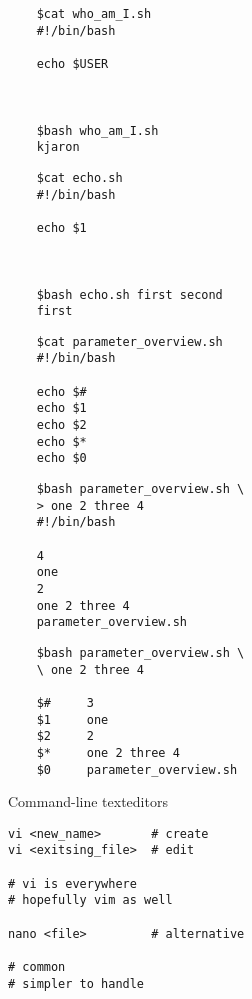 \documentclass[xcolor=dvipsnames]{beamer}
\begin{document}
\begin{frame}[fragile]
\LARGE
\begin{verbatim}
	$cat who_am_I.sh
	#!/bin/bash
	
	echo $USER
	
	
	
	$bash who_am_I.sh
	kjaron
\end{verbatim}
\end{frame}

\begin{frame}[fragile]
\LARGE
\begin{verbatim}
	$cat echo.sh
	#!/bin/bash
	
	echo $1
	
	
	
	$bash echo.sh first second
	first
\end{verbatim}
\end{frame}

\begin{frame}[fragile]
\LARGE
\begin{verbatim}
	$cat parameter_overview.sh
	#!/bin/bash
	
	echo $#
	echo $1
	echo $2
	echo $*
	echo $0
\end{verbatim}
\end{frame}

\begin{frame}[fragile]
\LARGE
\begin{verbatim}
	$bash parameter_overview.sh \
	> one 2 three 4
	#!/bin/bash
	
	4
	one
	2
	one 2 three 4
	parameter_overview.sh
\end{verbatim}
\end{frame}

\begin{frame}[fragile]
\LARGE
\begin{verbatim}
	$bash parameter_overview.sh \
	\ one 2 three 4
	
	$#     3
	$1     one
	$2     2
	$*     one 2 three 4
	$0     parameter_overview.sh
\end{verbatim}
\end{frame}

\begin{frame}[fragile]
	\begin{center}
		\Huge
		Command-line texteditors
	\end{center}
	\Large
\begin{verbatim}
vi <new_name>       # create
vi <exitsing_file>  # edit

# vi is everywhere
# hopefully vim as well

nano <file>         # alternative

# common
# simpler to handle
\end{verbatim}
\end{frame}
\end{document}

